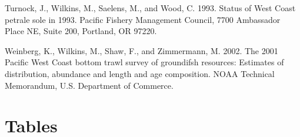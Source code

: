 \documentclass[12pt,]{article}
\begin{document}
\hypertarget{ref-turnock_status_1993}{}
Turnock, J., Wilkins, M., Saelens, M., and Wood, C. 1993. Status of West
Coast petrale sole in 1993. Pacific Fishery Management Council, 7700
Ambassador Place NE, Suite 200, Portland, OR 97220.

\hypertarget{ref-weinberg_2001_2002}{}
Weinberg, K., Wilkins, M., Shaw, F., and Zimmermann, M. 2002. The 2001
Pacific West Coast bottom trawl survey of groundifsh resources:
Estimates of distribution, abundance and length and age composition.
NOAA Technical Memorandum, U.S. Department of Commerce.

\newpage

\section{Tables}\label{tables}
\end{document}
